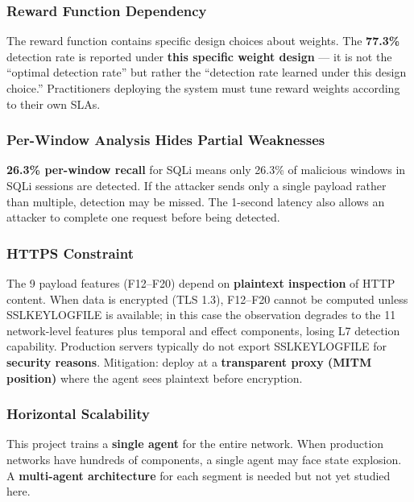 \documentclass[12pt,a4paper]{report}
\begin{document}
\subsubsection{Reward Function Dependency}

The reward function contains specific design choices about weights. The \textbf{77.3\%} detection rate is reported under \textbf{this specific weight design} --- it is not the ``optimal detection rate'' but rather the ``detection rate learned under this design choice.'' Practitioners deploying the system must tune reward weights according to their own SLAs.

\subsubsection{Per-Window Analysis Hides Partial Weaknesses}

\textbf{26.3\% per-window recall} for SQLi means only 26.3\% of malicious windows in SQLi sessions are detected. If the attacker sends only a single payload rather than multiple, detection may be missed. The 1-second latency also allows an attacker to complete one request before being detected.

\subsubsection{HTTPS Constraint}

The 9 payload features (F12--F20) depend on \textbf{plaintext inspection} of HTTP content. When data is encrypted (TLS 1.3), F12--F20 cannot be computed unless SSLKEYLOGFILE is available; in this case the observation degrades to the 11 network-level features plus temporal and effect components, losing L7 detection capability. Production servers typically do not export SSLKEYLOGFILE for \textbf{security reasons}. Mitigation: deploy at a \textbf{transparent proxy (MITM position)} where the agent sees plaintext before encryption.

\subsubsection{Horizontal Scalability}

This project trains a \textbf{single agent} for the entire network. When production networks have hundreds of components, a single agent may face state explosion. A \textbf{multi-agent architecture} for each segment is needed but not yet studied here.

\end{document}
